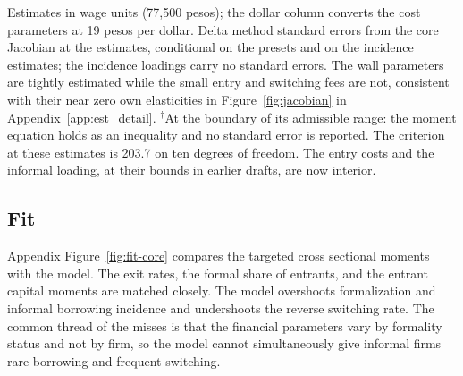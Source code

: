 \documentclass[12pt]{article}
\begin{document}
\begin{table}[H]
    \par\footnotesize Estimates in wage units (77{,}500 pesos); the dollar column converts the cost parameters at 19 pesos per dollar. Delta method standard errors from the core Jacobian at the estimates, conditional on the presets and on the incidence estimates; the incidence loadings carry no standard errors. The wall parameters are tightly estimated while the small entry and switching fees are not, consistent with their near zero own elasticities in Figure~\ref{fig:jacobian} in Appendix~\ref{app:est_detail}. $^{\dagger}$At the boundary of its admissible range: the moment equation holds as an inequality and no standard error is reported. The criterion at these estimates is 203.7 on ten degrees of freedom. The entry costs and the informal loading, at their bounds in earlier drafts, are now interior.
\end{table}

\subsection{Fit}
\label{sec:est-fit}

Appendix Figure~\ref{fig:fit-core} compares the targeted cross sectional moments with the model. The exit rates, the formal share of entrants, and the entrant capital moments are matched closely. The model overshoots formalization and informal borrowing incidence and undershoots the reverse switching rate. The common thread of the misses is that the financial parameters vary by formality status and not by firm, so the model cannot simultaneously give informal firms rare borrowing and frequent switching. 
\end{document}
